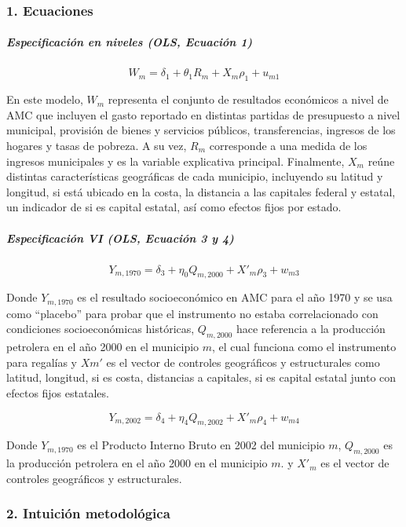 \documentclass[
]{article}
\begin{document}
\subsubsection{1. Ecuaciones}\label{ecuaciones}

\subparagraph{Especificación en niveles (OLS, Ecuación
1)}\label{especificaciuxf3n-en-niveles-ols-ecuaciuxf3n-1}

\[W_{m}= δ_1​+θ_1​R_m​+X_mρ_1​+u_{m1}​\]

En este modelo, \(W_m\) representa el conjunto de resultados económicos
a nivel de AMC que incluyen el gasto reportado en distintas partidas de
presupuesto a nivel municipal, provisión de bienes y servicios públicos,
transferencias, ingresos de los hogares y tasas de pobreza. A su vez,
\(R_m\) corresponde a una medida de los ingresos municipales y es la
variable explicativa principal. Finalmente, \(X_m\) reúne distintas
características geográficas de cada municipio, incluyendo su latitud y
longitud, si está ubicado en la costa, la distancia a las capitales
federal y estatal, un indicador de si es capital estatal, así como
efectos fijos por estado.

\subparagraph{Especificación VI (OLS, Ecuación 3 y
4)}\label{especificaciuxf3n-vi-ols-ecuaciuxf3n-3-y-4}

\[Y_{m,1970}=δ_3+η_0 Q_{m,2000}+X'_mρ_3+ w_{m3}\]

Donde \(Y_{m,1970}\) es el resultado socioeconómico en AMC para el año
1970 y se usa como ``placebo'' para probar que el instrumento no estaba
correlacionado con condiciones socioeconómicas históricas,
\(Q_{m,2000}\) hace referencia a la producción petrolera en el año 2000
en el municipio \(m\), el cual funciona como el instrumento para
regalías y \(Xm′\) es el vector de controles geográficos y estructurales
como latitud, longitud, si es costa, distancias a capitales, si es
capital estatal junto con efectos fijos estatales.

\[Y_{m,2002} = δ_4+η_4Q_{m,2002}+X'_mρ_4+w_{m4}\]

Donde \(Y_{m,1970}\) es el Producto Interno Bruto en 2002 del municipio
\(m\), \(Q_{m,2000}\) es la producción petrolera en el año 2000 en el
municipio \(m\). y \(X'_m\) es el vector de controles geográficos y
estructurales.

\subsubsection{2. Intuición
metodológica}\label{intuiciuxf3n-metodoluxf3gica}
\end{document}
